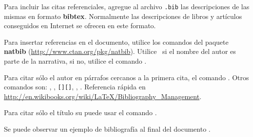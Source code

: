 
Para incluir las citas referenciales, agregue al archivo \texttt{.bib} las descripciones de las mismas en formato \textbf{bibtex}. Normalmente las descripciones de libros y artículos conseguidos en Internet se ofrecen en este formato.

Para insertar referencias en el documento, utilice los comandos del paquete \textbf{natbib} (\url{http://www.ctan.org/pkg/natbib}). Utilice \pa\ si el nombre del autor es parte de la narrativa, si no, utilice el comando \pa.

Para citar sólo el autor en párrafos cercanos a la primera cita, el comando \pa. Otros comandos son: , , \texttt{[][]}, , . Referencia rápida en \url{http://en.wikibooks.org/wiki/LaTeX/Bibliography_Management}.

Para citar sólo el título su puede usar el comando \pa.

Se puede observar un ejemplo de bibliografía al final del documento \citep{wikibib}.

